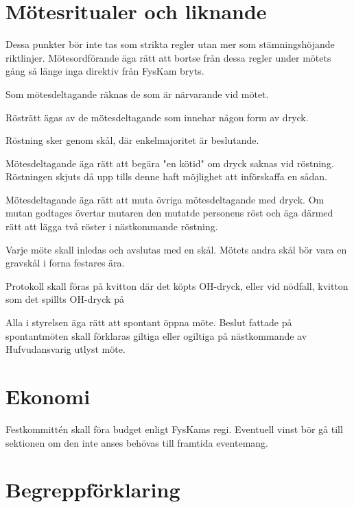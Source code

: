 \documentclass{../resources/dgovdoc}
\begin{document}
\section{Mötesritualer och liknande}

Dessa punkter bör inte tas som strikta regler utan mer som stämningshöjande riktlinjer. Mötesordförande äga rätt att bortse från dessa regler under mötets gång så länge inga direktiv från FysKam bryts.

Som mötesdeltagande räknas de som är närvarande vid mötet.

Rösträtt ägas av de mötesdeltagande som innehar någon form av dryck.

Röstning sker genom skål, där enkelmajoritet är beslutande.

Mötesdeltagande äga rätt att begära "en kötid" om dryck saknas vid röstning. Röstningen skjuts då upp tills denne haft möjlighet att införskaffa en sådan.

Mötesdeltagande äga rätt att muta övriga mötesdeltagande med dryck. Om mutan godtages övertar mutaren den mutatde personens röst och äga därmed rätt att lägga två röster i nästkommande röstning.

Varje möte skall inledas och avslutas med en skål. Mötets andra skål bör vara en gravskål i forna festares ära.

Protokoll skall föras på kvitton där det köpts OH-dryck, eller vid nödfall, kvitton som det spillts OH-dryck på

Alla i styrelsen äga rätt att spontant öppna möte. Beslut fattade på spontantmöten skall förklaras giltiga eller ogiltiga på nästkommande av Hufvudansvarig utlyst möte.

\section{Ekonomi}

Festkommittén skall föra budget enligt FysKams regi.
Eventuell vinst bör gå till sektionen om den inte anses behövas till framtida eventemang.

\section{Begreppförklaring}
\end{document}
